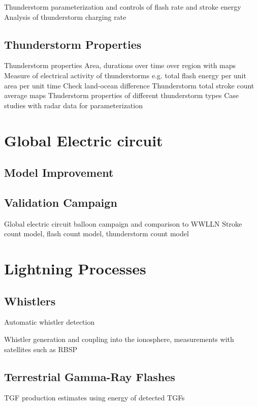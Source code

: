   Thunderstorm parameterization and controls of flash rate and stroke energy
  Analysis of thunderstorm charging rate

\subsection{Thunderstorm Properties}

 Thunderstorm properties
  Area, durations over time over region with maps
  Measure of electrical activity of thunderstorms
     e.g. total flash energy per unit area per unit time
     Check land-ocean difference
  Thunderstorm total stroke count average maps
  Thuderstorm properties of different thunderstorm types
  Case studies with radar data for parameterization

\section{Global Electric circuit}

\subsection{Model Improvement}

\subsection{Validation Campaign}

Global electric circuit balloon campaign and comparison to WWLLN
  Stroke count model, flash count model, thunderstorm count model

\section{Lightning Processes}

\subsection{Whistlers}

  Automatic whistler detection

Whistler generation and coupling into the ionosphere, measurements with satellites such as RBSP

\subsection{Terrestrial Gamma-Ray Flashes}

 TGF production estimates using energy of detected TGFs





